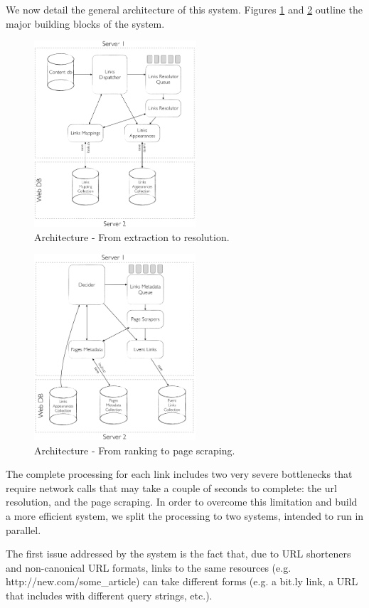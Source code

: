 \documentclass{sig-alternate}
\begin{document}
We now detail the general architecture of this system. Figures \ref{fig:architecture_resolution} and \ref{fig:architecture_metadata} outline the major building blocks of the system.
\begin{figure}[htbp]
  \centering
  \includegraphics[width=6cm]{Figures/links_processing_architecture_resolution.png}
  \caption{Architecture - From extraction to resolution.}
  \label{fig:architecture_resolution}
\end{figure}
\begin{figure}[htbp]
  \centering
  \includegraphics[width=6cm]{Figures/links_processing_architecture_metadata.png}
  \caption{Architecture - From ranking to page scraping.}
  \label{fig:architecture_metadata}
\end{figure}

The complete processing for each link includes two very severe bottlenecks that require network calls that may take a couple of seconds to complete: the url resolution, and the page scraping. In order to overcome this limitation and build a more efficient system, we split the processing to two systems, intended to run in parallel.

The first issue addressed by the system is the fact that, due to URL shorteners and non-canonical URL formats, links to the same resources (e.g. http://new.com/some\_article) can take different forms (e.g. a bit.ly link, a URL that includes with different query strings, etc.).  
\end{document}
